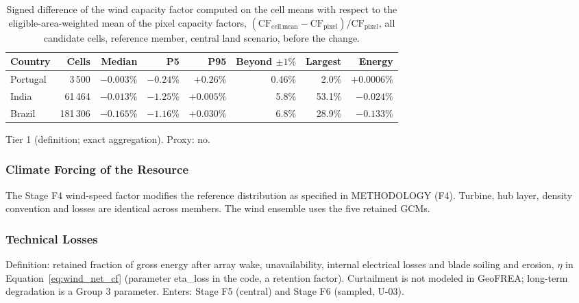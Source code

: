 \begin{table}[htbp]
    \centering
    \caption{Signed difference of the wind capacity factor computed on the cell means
    with respect to the eligible-area-weighted mean of the pixel capacity factors,
    $(\mathrm{CF}_{\mathrm{cell\,mean}}-\mathrm{CF}_{\mathrm{pixel}})/\mathrm{CF}_{\mathrm{pixel}}$,
    all candidate cells, reference member, central land scenario, before the change.}
    \label{tab:g1_pixel_bias}
    \small
    \begin{tabular}{lrrrrrrr}
        \toprule
        Country & Cells & Median & P5 & P95 & Beyond $\pm1\%$ & Largest & Energy \\
        \midrule
        Portugal & 3\,500   & $-0.003\%$ & $-0.24\%$ & $+0.26\%$ & 0.46\% & 2.0\%  & $+0.0006\%$ \\
        India    & 61\,464  & $-0.013\%$ & $-1.25\%$ & $+0.005\%$ & 5.8\% & 53.1\% & $-0.024\%$ \\
        Brazil   & 181\,306 & $-0.165\%$ & $-1.16\%$ & $+0.030\%$ & 6.8\% & 28.9\% & $-0.133\%$ \\
        \bottomrule
    \end{tabular}
\end{table}

Tier 1 (definition; exact aggregation). Proxy: no.

\subsubsection{Climate Forcing of the Resource}

The Stage F4 wind-speed factor modifies the reference distribution as
specified in METHODOLOGY (F4). Turbine, hub layer, density convention and
losses are identical across members. The wind ensemble uses the five
retained GCMs.

\subsubsection{Technical Losses}

Definition: retained fraction of gross energy after array wake,
unavailability, internal electrical losses and blade soiling and erosion,
$\eta$ in Equation~\ref{eq:wind_net_cf} (parameter eta\_loss in the
code, a retention factor). Curtailment is not modeled in GeoFREA;
long-term degradation is a Group 3 parameter. Enters: Stage F5 (central)
and Stage F6 (sampled, U-03).

